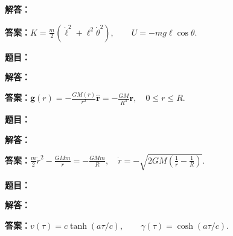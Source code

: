 \documentclass[lang=cn,color=blue,11pt]{elegantbook}
\begin{document}
\par\noindent\textbf{解答：}
\par\noindent\textbf{答案：}\(\displaystyle 
K=\frac m2(\dot\ell^2+\ell^2\dot\theta^2),\qquad U=-mg\ell\cos\theta .
\)\par
\par\smallskip\noindent\hrulefill\par\medskip
{}\par
\noindent\textbf{题目：}
\par\noindent\textbf{解答：}
\par\noindent\textbf{答案：}\(\displaystyle 
\boldsymbol g(r)=-\frac{GM(r)}{r^2}\hat{\boldsymbol r}
=-\frac{GM}{R^3}\boldsymbol r,\quad 0\le r\le R.
\)\par
\par\smallskip\noindent\hrulefill\par\medskip
{}\par
\noindent\textbf{题目：}
\par\noindent\textbf{解答：}
\par\noindent\textbf{答案：}\(\displaystyle 
\frac m2\dot r^2-\frac{GMm}{r}=-\frac{GMm}{R},\quad
\dot r=-\sqrt{2GM\left(\frac1r-\frac1R\right)}.
\)\par
\par\smallskip\noindent\hrulefill\par\medskip
{}\par
\noindent\textbf{题目：}
\par\noindent\textbf{解答：}
\par\noindent\textbf{答案：}\(\displaystyle 
v(\tau)=c\tanh(a\tau/c),\qquad \gamma(\tau)=\cosh(a\tau/c).
\)\par
\par\smallskip\noindent\hrulefill\par\medskip
{}\par
\end{document}

